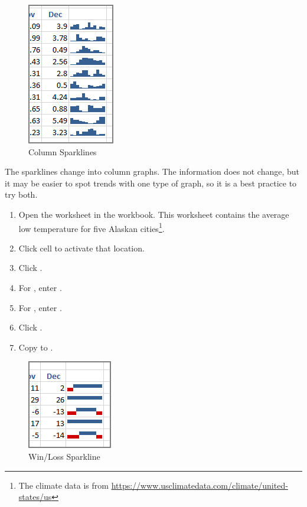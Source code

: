 \begin{figure}[H]
	\centering
	\includegraphics[width=\maxwidth{.50\linewidth}]{gfx/ch08_fig05}
	\caption{Column Sparklines}
	\label{08:fig05}
\end{figure}

The sparklines change into column graphs. The information does not change, but it may be easier to spot trends with one type of graph, so it is a best practice to try both.

\begin{enumbox}
	\begin{enumerate}
		\item Open the  worksheet in the  workbook. This worksheet contains the average low temperature for five Alaskan cities\footnote{The climate data is from  \url{https://www.usclimatedata.com/climate/united-states/us}}.
		\item Click cell  to activate that location.
		\item Click .
		\item For , enter .
		\item For , enter .
		\item Click .
		\item Copy  to .
	\end{enumerate}
\end{enumbox}
	
\begin{figure}[H]
	\centering
	\includegraphics[width=\maxwidth{.50\linewidth}]{gfx/ch08_fig06}
	\caption{Win/Loss Sparkline}
	\label{08:fig06}
\end{figure}

